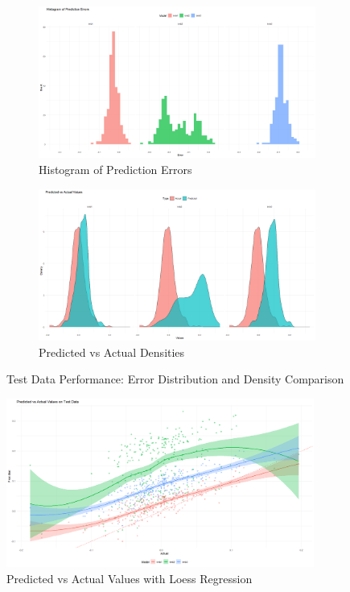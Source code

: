 \documentclass[12pt, twoside,hidelinks]{article}
\theoremstyle{definition}
\numberwithin{equation}{section}
\begin{document}
\begin{figure}[ht!]
    \centering
    \begin{subfigure}[b]{0.45\textwidth}
        \includegraphics[width=\textwidth]{visuals/Visuals_ts_ridge/hist_pred_errors.png}
        \caption{Histogram of Prediction Errors}
        \label{fig:hist_pred_errors}
    \end{subfigure}
    \hfill
    \begin{subfigure}[b]{0.45\textwidth}
        \includegraphics[width=\textwidth]{visuals/Visuals_ts_ridge/Predicted_vs_actual_densities_ts_ridge.png}
        \caption{Predicted vs Actual Densities}
        \label{fig:predicted_vs_actual_densities}
    \end{subfigure}
    \caption{Test Data Performance: Error Distribution and Density Comparison}
    \label{fig:test_data_performance_1}
\end{figure}


\begin{figure}[ht!]
    \centering
    \includegraphics[width=0.9\textwidth]{visuals/Visuals_ts_ridge/predicted_vs_actual_test_data_lines.png}
    \caption{Predicted vs Actual Values with Loess Regression}
    \label{fig:predicted_vs_actual_lines}
\end{figure}
\end{document}
